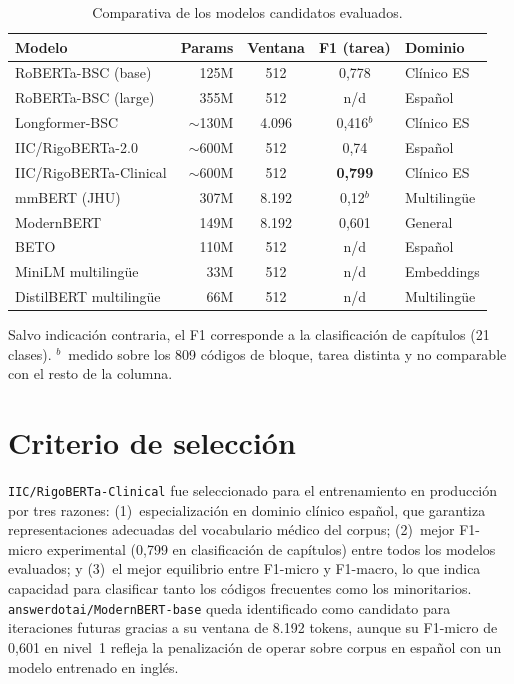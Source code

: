 \begin{table}[h]
\centering
\caption{Comparativa de los modelos candidatos evaluados.}
\label{tab:modelos}
\begin{tabular}{lrccl}
\hline
\textbf{Modelo} & \textbf{Params} & \textbf{Ventana} & \textbf{F1 (tarea)} & \textbf{Dominio} \\
\hline
RoBERTa-BSC (base) & 125M & 512 & 0{,}778 & Clínico ES \\
RoBERTa-BSC (large) & 355M & 512 &  n/d & Español \\
Longformer-BSC & $\sim$130M & 4.096 & 0{,}416$^{b}$ & Clínico ES \\
IIC/RigoBERTa-2.0 & $\sim$600M & 512 & 0{,}74 & Español \\
IIC/RigoBERTa-Clinical & $\sim$600M & 512 & \textbf{0{,}799} & Clínico ES \\
mmBERT (JHU) & 307M & 8.192 & 0{,}12$^{b}$ & Multilingüe \\
ModernBERT & 149M & 8.192 & 0{,}601 & General \\
BETO & 110M & 512 &  n/d & Español \\
MiniLM multilingüe & 33M & 512 &  n/d & Embeddings \\
DistilBERT multilingüe & 66M & 512 &  n/d & Multilingüe \\
\hline
\end{tabular}

\smallskip\par\footnotesize Salvo indicación contraria, el F1 corresponde a la clasificación de capítulos (21 clases). $^{b}$~medido sobre los 809 códigos de bloque, tarea distinta y no comparable con el resto de la columna.
\end{table}

\section{Criterio de selección}

\texttt{IIC/RigoBERTa-Clinical} fue seleccionado para el entrenamiento en producción por tres razones: (1)~especialización en dominio clínico español, que garantiza representaciones adecuadas del vocabulario médico del corpus; (2)~mejor F1-micro experimental (0{,}799 en clasificación de capítulos) entre todos los modelos evaluados; y (3)~el mejor equilibrio entre F1-micro y F1-macro, lo que indica capacidad para clasificar tanto los códigos frecuentes como los minoritarios. \texttt{answerdotai/ModernBERT-base} queda identificado como candidato para iteraciones futuras gracias a su ventana de 8.192 tokens, aunque su F1-micro de 0{,}601 en nivel~1 refleja la penalización de operar sobre corpus en español con un modelo entrenado en inglés.
